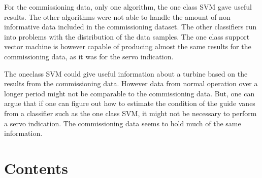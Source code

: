 \documentclass{article}
\begin{document}
    For the commissioning data, only one algorithm, the one class SVM gave useful results. The other algorithms were not able to handle the amount of non informative data included in the commissioning dataset. The other classifiers run into problems with the distribution of the data samples.  The one class support vector machine is however capable of producing almost the same results for the commissioning data, as it was for the servo indication. 


    The oneclass SVM could give useful information about a turbine based on the results from the commissioning data.  However data from normal operation over a longer period might not be comparable to the commissioning data. But, one can argue that if one can figure out how to estimate the condition of the guide vanes from a classifier such as the one class SVM, it might not be necessary to perform a servo indication. The commissioning data seems to hold much of the same information.
    
    
\clearpage    

\section*{Contents}
\makeatletter
{}
\makeatother
\newpage


 














\newpage


\printbibliography[heading=bibintoc,
title={Bibliography}]

\end{document}
